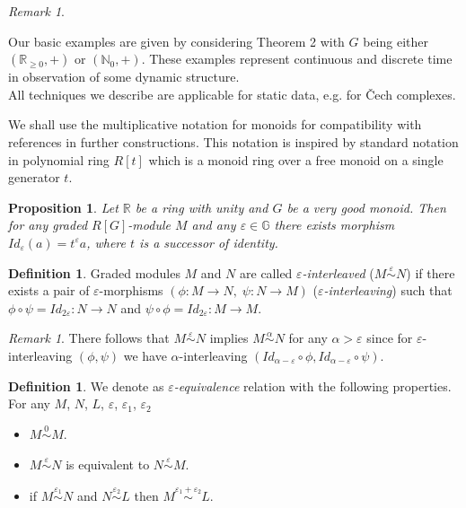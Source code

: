 \documentclass[english,12pt]{article}
\newcounter{stmcounter}[section]
\numberwithin{equation}{section}
\newtheorem{proposition}[stmcounter]{Proposition}
\theoremstyle{definition}
\newtheorem{definition}[stmcounter]{Definition}
\theoremstyle{remark}
\newtheorem{remark}[stmcounter]{Remark}
\newcommand{\define}[1]{{\textit{#1}}}
\renewcommand{\geq}{\geqslant}
\begin{document}
\begin{remark} ~ \par
  Our basic examples are given by considering Theorem 2 with $G$ being either $(\mathbb{R}_{\geq 0},+)$ or $(\mathbb{N}_0,+)$. These examples represent continuous and discrete time in observation of some dynamic structure.\\

  All techniques we describe are applicable for static data, e.g. for Čech complexes.\\
\end{remark}

We shall use the multiplicative notation for monoids for compatibility with references in further constructions. This notation is inspired by standard notation in polynomial ring $R[t]$ which is a monoid ring over a free monoid on a single generator $t$.

\begin{proposition}
  Let $\mathbb{R}$ be a ring with unity and $G$ be a very good monoid. Then for any graded $R[G]$-module $M$ and any $\varepsilon \in \mathbb{G}$ there exists morphism $Id_{\varepsilon}(a) = t^{\varepsilon}a$, where $t$ is a successor of identity.
\end{proposition}

\begin{definition}
  Graded modules $M$ and $N$ are called \define{$\varepsilon$-interleaved} ($M \stackrel{\varepsilon}{\sim} N$) if there exists a pair of $\varepsilon$-morphisms $(\phi : M \to N,\;\psi : N \to M)$ (\define{$\varepsilon$-interleaving}) such that $\phi \circ \psi = Id_{2\varepsilon} : N \to N$ and $\psi \circ \phi = Id_{2\varepsilon} : M \to M$.\\
\end{definition}

\begin{remark}
  There follows that $M \stackrel{\varepsilon}{\sim} N$ implies $M \stackrel{\alpha}{\sim} N$ for any $\alpha > \varepsilon$ since for $\varepsilon$-interleaving $(\phi, \psi)$ we have $\alpha$-interleaving $(Id_{\alpha - \varepsilon} \circ \phi, Id_{\alpha - \varepsilon} \circ \psi)$.
\end{remark}

\begin{definition}
  We denote as \define{$\varepsilon$-equivalence} relation with the following properties.\\
  For any $M$, $N$, $L$, $\varepsilon$, $\varepsilon_1$, $\varepsilon_2$
  \begin{itemize}
    \item $M \stackrel{0}{\sim} M$.
    \item $M \stackrel{\varepsilon}{\sim} N$ is equivalent to $N \stackrel{\varepsilon}{\sim} M$.
    \item if $M \stackrel{\varepsilon_1}{\sim} N$ and $N \stackrel{\varepsilon_2}{\sim} L$ then $M \stackrel{\varepsilon_1 + \varepsilon_2}{\sim} L$.
  \end{itemize}
\end{definition}
\end{document}
